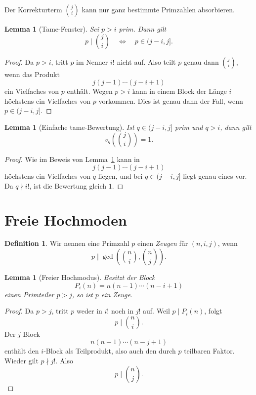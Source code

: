 \documentclass[12pt,a4paper]{article}
\theoremstyle{plain}
\newtheorem{lemma}[theorem]{Lemma}
\theoremstyle{definition}
\newtheorem{definition}[theorem]{Definition}
\theoremstyle{remark}
\begin{document}
	Der Korrekturterm \(\binom ji\) kann nur ganz bestimmte Primzahlen absorbieren.
	
	\begin{lemma}[Tame-Fenster]
		\label{lem:tame-window}
		Sei \(p>i\) prim. Dann gilt
		\[
		p\mid \binom ji
		\quad\Longleftrightarrow\quad
		p\in(j-i,j].
		\]
	\end{lemma}
	
	\begin{proof}
		Da \(p>i\), tritt \(p\) im Nenner \(i!\) nicht auf. Also teilt \(p\) genau dann \(\binom ji\), wenn das Produkt
		\[
		j(j-1)\cdots(j-i+1)
		\]
		ein Vielfaches von \(p\) enthält. Wegen \(p>i\) kann in einem Block der Länge \(i\) höchstens ein Vielfaches von \(p\) vorkommen. Dies ist genau dann der Fall, wenn \(p\in(j-i,j]\).
	\end{proof}
	
	\begin{lemma}[Einfache tame-Bewertung]
		\label{lem:tame-valuation}
		Ist \(q\in(j-i,j]\) prim und \(q>i\), dann gilt
		\[
		v_q\!\left(\binom ji\right)=1.
		\]
	\end{lemma}
	
	\begin{proof}
		Wie im Beweis von Lemma~\ref{lem:tame-window} kann in
		\[
		j(j-1)\cdots(j-i+1)
		\]
		höchstens ein Vielfaches von \(q\) liegen, und bei \(q\in(j-i,j]\) liegt genau eines vor. Da \(q\nmid i!\), ist die Bewertung gleich \(1\).
	\end{proof}
	
	\section{Freie Hochmoden}
	
	\begin{definition}
		Wir nennen eine Primzahl \(p\) einen \emph{Zeugen} für \((n,i,j)\), wenn
		\[
		p\mid \gcd\!\left(\binom ni,\binom nj\right).
		\]
	\end{definition}
	
	\begin{lemma}[Freier Hochmodus]
		\label{lem:free-large-prime}
		Besitzt der Block
		\[
		P_i(n)=n(n-1)\cdots(n-i+1)
		\]
		einen Primteiler \(p>j\), so ist \(p\) ein Zeuge.
	\end{lemma}
	
	\begin{proof}
		Da \(p>j\), tritt \(p\) weder in \(i!\) noch in \(j!\) auf. Weil \(p\mid P_i(n)\), folgt
		\[
		p\mid \binom ni.
		\]
		Der \(j\)-Block
		\[
		n(n-1)\cdots(n-j+1)
		\]
		enthält den \(i\)-Block als Teilprodukt, also auch den durch \(p\) teilbaren Faktor. Wieder gilt \(p\nmid j!\). Also
		\[
		p\mid \binom nj.
		\]
	\end{proof}
	
\end{document}
